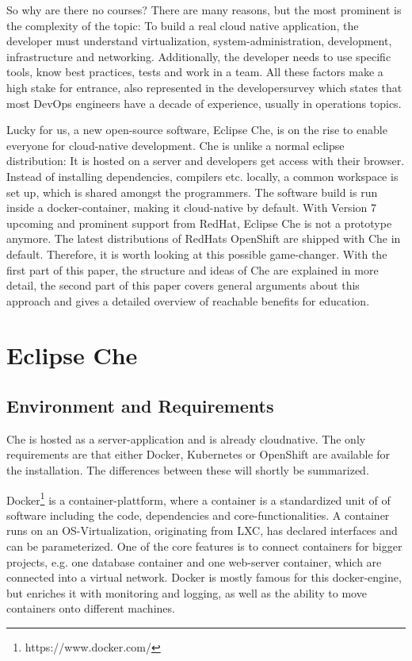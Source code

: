 \documentclass[utf8]{lni}
\begin{document}
So why are there no courses? There are many reasons, but the most prominent is the complexity of the topic: 
To build a real cloud native application, the developer must understand virtualization, system-administration, development, 
infrastructure  and  networking. 
Additionally, the developer needs to use specific tools, know best practices, tests and work in a team.
All these factors make a high stake for entrance, also  represented in the developersurvey \cite{SO19} which states that most DevOps engineers have a decade of experience, usually in operations topics.

Lucky for us, a new open-source software, Eclipse Che, is on the rise to enable everyone for cloud-native development.
Che is unlike a normal eclipse distribution: 
It is hosted on a server and developers get access with their browser. 
Instead of installing dependencies, compilers etc. locally, a common workspace is set up, which is shared amongst the programmers. 
The software build is run inside a docker-container, making it cloud-native by default. 
With Version 7 upcoming and prominent support from RedHat, Eclipse Che is not a prototype anymore. 
The latest distributions of RedHats OpenShift are shipped with Che in default. 
Therefore, it is worth looking at this possible game-changer. 
With the first part of this paper, the structure and ideas of Che are explained in more detail, the second part of this paper covers general arguments about this approach and gives a detailed overview of reachable benefits for education.    

\section{Eclipse Che}
\label{sec:Che}
\subsection{Environment and Requirements}
\label{subsec:Req}
Che is hosted as a server-application and is already cloudnative. 
The only requirements are that either Docker, Kubernetes or OpenShift are available for the installation.
The differences between these will shortly be summarized.
 
Docker\footnote{https://www.docker.com/} is a container-plattform, where a container is a standardized unit of of software including the code, dependencies and core-functionalities. 
A container runs on an OS-Virtualization, originating from LXC, has declared interfaces and can be parameterized. 
One of the core features is to connect containers for bigger projects, e.g. one 
database container and one web-server container, which are connected into a virtual network. 
Docker is mostly famous for this docker-engine, but enriches it with monitoring and logging, as well as the ability to move containers onto different machines.   
\end{document}
